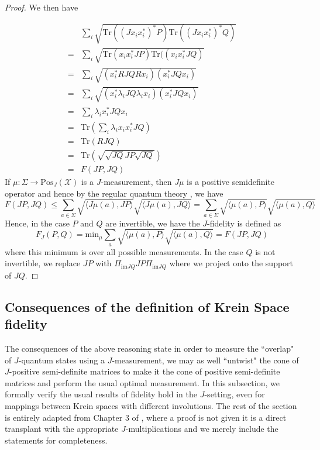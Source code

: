 \documentclass{amsart}
\numberwithin{equation}{section}
\theoremstyle{definition}
\theoremstyle{plain}
\theoremstyle{solutionstyle}
\begin{document}
\begin{proof}
    We then have 

    
    \begin{align*}
        &\sum_{i}\sqrt{\mathrm{Tr}((Jx_ix_i^*)^*P)\mathrm{Tr}((Jx_ix_i^*)^*Q)}\\=& \sum_{i}\sqrt{\mathrm{Tr}(x_ix_i^*JP)\mathrm{Tr}((x_ix_i^* JQ)}\\
        =& \sum_i \sqrt{(x_i^*RJQRx_i)(x_i^*JQx_i)}\\
        =& \sum_i \sqrt{(x_i^*\lambda_i JQ\lambda_ix_i)(x_i^*JQx_i)}\\
        =& \sum_i \lambda_ix_i^*JQx_i\\
        =&\mathrm{Tr}(\sum_{i}\lambda_ix_ix_i^*JQ)\\=&\mathrm{Tr}(RJQ)\\
        =&\mathrm{Tr}(\sqrt{\sqrt{JQ}JP\sqrt{JQ}})\\
        =&F(JP,JQ)
    \end{align*}
    If $\mu:\Sigma\to \mathrm{Pos}_J(\mathcal{X})$ is a $J$-measurement, then $J\mu$ is a positive semidefinite operator and hence by the regular quantum theory \cite[pp.~153--155]{Watrous_2018}, we have 
    \begin{equation*}
        F(JP,JQ)\leq \sum_{a\in \Sigma}\sqrt{\langle J\mu(a), JP\rangle}\sqrt{\langle J\mu(a),JQ\rangle}=\sum_{a\in \Sigma}\sqrt{\langle \mu(a), P\rangle}\sqrt{\langle \mu(a),Q\rangle}
    \end{equation*}
    Hence, in the case $P$ and $Q$ are invertible, we have the $J$-fidelity is defined as 
    \begin{equation*}F_J(P,Q)=\mathrm{min}_{\mu}\sum_{a}\sqrt{\langle \mu(a),P\rangle}\sqrt{\langle \mu(a), Q\rangle}=F(JP, JQ)\end{equation*}
    where this minimum is over all possible measurements.
     In the case $Q$ is not invertible, we replace $JP$ with $\Pi_{\mathrm{im}{JQ}}JP\Pi_{\mathrm{im}{JQ}}$ where we project onto the support of $JQ$. 
\end{proof}

 \subsection{Consequences of the definition of Krein Space fidelity}\label{conseqeunces of definiton}

The consequences of the above reasoning state in order to measure the ``overlap" of $J$-quantum states using a $J$-measurement, we may as well ``untwist" the cone of $J$-positive semi-definite matrices to make it the cone of positive semi-definite matrices and perform the usual optimal measurement. In this subsection, we formally verify the usual results of fidelity hold in the $J$-setting, even for mappings between Krein spaces with different involutions. The rest of the section is entirely adapted from Chapter 3 of \cite{Watrous_2018}, where a proof is not given it is a direct transplant with the appropriate $J$-multiplications and we merely include the statements for completeness.
\end{document}

